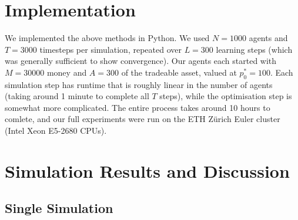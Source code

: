 \documentclass[11pt]{article}
\begin{document}
\section{Implementation}

We implemented the above methods in Python. We used $N=1000$ agents and $T=3000$ timesteps per simulation, repeated over $L=300$ learning steps (which was generally sufficient to show convergence). Our agents each started with $M=30000$ money and $A=300$ of the tradeable asset, valued at $p_0^*=100$. Each simulation step has runtime that is roughly linear in the number of agents (taking around 1 minute to complete all $T$ steps), while the optimisation step is somewhat more complicated. The entire process takes around 10 hours to comlete, and our full experiments were run on the ETH Z\"urich Euler cluster (Intel Xeon E5-2680 CPUs).

\section{Simulation Results and Discussion}

\subsection{Single Simulation}
\end{document}

